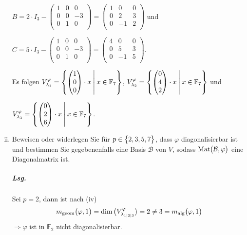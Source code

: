 \documentclass{scrreprt}
\newcommand{\Mat}{\text{Mat}}
\begin{document}
\begin{enumerate}[(i)]
  $B = 2 \cdot I_3 - \begin{pmatrix}
    1 & 0 & 0 \\
    0 & 0 & -3 \\
    0 & 1 & 0 \\
  \end{pmatrix} = \begin{pmatrix}
    1 & 0 & 0 \\
    0 & 2 & 3 \\
    0 & -1 & 2 \\
  \end{pmatrix}$ und

  $C = 5 \cdot I_3 - \begin{pmatrix}
    1 & 0 & 0 \\
    0 & 0 & -3 \\
    0 & 1 & 0 \\
  \end{pmatrix} = \begin{pmatrix}
    4 & 0 & 0 \\
    0 & 5 & 3 \\
    0 & -1 & 5 \\
  \end{pmatrix}$.

  Es folgen $V_{\lambda_1}^{\varphi} = \qty{
    \begin{pmatrix}1\\0\\0\end{pmatrix} \cdot x
    \:\middle |\: x \in \mathbb{F}_7
  }$, $V_{\lambda_2}^{\varphi} = \qty{
    \begin{pmatrix}0\\4\\2\end{pmatrix} \cdot x
    \:\middle |\: x \in \mathbb{F}_7
  }$ und

  $V_{\lambda_3}^{\varphi} = \qty{
    \begin{pmatrix}0\\2\\6\end{pmatrix} \cdot x
    \:\middle |\: x \in \mathbb{F}_7
  }$.

\item Beweisen oder widerlegen Sie für $p \in \qty\big{2, 3, 5, 7}$, dass
  $\varphi$ diagonalisierbar ist und bestimmen Sie gegebenenfalls eine Basis
  $\mathcal{B}$ von $V$, sodass $\Mat\qty\big(\mathcal{B}, \varphi)$ eine
  Diagonalmatrix ist.

  \subparagraph{Lsg.} Sei $p = 2$, dann ist nach (iv)
  \[
    m_{\text{geom}}\qty\big(\varphi, 1) =
    \dim\qty\big(V_{\lambda_{1|2|3}}^{\varphi}) = 2 \ne
    3 = m_{\text{alg}}\qty\big(\varphi, 1)
  \]
  $\Rightarrow \varphi$ ist in $\mathbb{F}_2$ nicht diagonalisierbar.


\end{enumerate}
\end{document}
